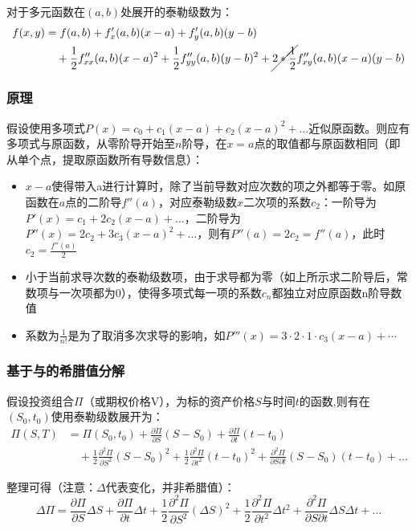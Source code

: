 \documentclass[11pt]{article}
\begin{document}
对于多元函数在$(a,b)$处展开的泰勒级数为：
\begin{align*}
    f(x,y) &= f(a,b) + f'_x(a,b)(x-a) + f'_y(a,b)(y-b) \\
    &\quad + \frac{1}{2}f''_{xx}(a,b)(x-a)^2 + \frac{1}{2}f''_{yy}(a,b)(y-b)^2 +\cancel{2*\frac{1}{2}}f''_{xy}(a,b)(x-a)(y-b)
\end{align*}

\subsubsection*{原理}
假设使用多项式$P(x) = c_0 + c_1 (x-a) + c_2 (x-a)^2 + \dots$近似原函数。则应有多项式与原函数，从零阶导开始至$n$阶导，在$x=a$点的取值都与原函数相同（即从单个点，提取原函数所有导数信息）：
\begin{itemize}
    \item $x-a$使得带入a进行计算时，除了当前导数对应次数的项之外都等于零。如原函数在$a$点的二阶导$f''(a)$，对应泰勒级数$x$二次项的系数$c_2$：一阶导为$P'(x) = c_1 + 2c_2(x-a)+\dots$，二阶导为$P''(x) = 2c_2 + 3c_3(x-a)^2 + \dots$，则有$P''(a) = 2c_2 = f''(a)$，此时$c_2 = \tfrac{f''(a)}{2}$
    \item 小于当前求导次数的泰勒级数项，由于求导都为零（如上所示求二阶导后，常数项与一次项都为0），使得多项式每一项的系数$c_n$都独立对应原函数n阶导数值
    \item 系数为$\frac{1}{n!}$是为了取消多次求导的影响，如$P'''(x)=3 \cdot 2 \cdot 1 \cdot c_3(x-a) + \cdots$
\end{itemize}

\subsubsection{基于与的希腊值分解}

假设投资组合$\Pi$（或期权价格V），为标的资产价格$S$与时间$t$的函数,则有在$(S_0,t_0)$使用泰勒级数展开为：
\begin{align*}
    \Pi(S,T) &= \Pi(S_0,t_0) + \frac{\partial \Pi}{\partial S}(S-S_0) + \frac{\partial \Pi}{\partial t}(t-t_0) \\
    &\quad + \frac{1}{2}\frac{\partial^2 \Pi}{\partial S^2}(S-S_0)^2 + \frac{1}{2}\frac{\partial^2 \Pi}{\partial t^2}(t-t_0)^2 + \frac{\partial^2 \Pi}{\partial S \partial t}(S-S_0)(t-t_0) + \dots
\end{align*}

整理可得（注意：$\Delta$代表变化，并非希腊值）：
\begin{equation*}
    \Delta \Pi = \frac{\partial \Pi}{\partial S}\Delta S + \frac{\partial \Pi}{\partial t}\Delta t + \frac{1}{2}\frac{\partial^2 \Pi}{\partial S^2}(\Delta S)^2 + \frac{1}{2}\frac{\partial^2 \Pi}{\partial t^2}\Delta t^2 + \frac{\partial^2 \Pi}{\partial S \partial t}\Delta S \Delta t + \dots
\end{equation*}
\end{document}
